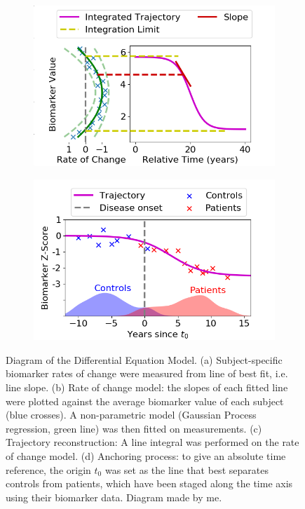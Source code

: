 \begin{figure}
  \begin{subfigure}{0.47\textwidth}
    \includegraphics[width=\textwidth]{images/demDiagramPlots/fig3_recon.png}
    \caption{}
    \label{fig:pcaDemDiagramC}
 \end{subfigure}
 \begin{subfigure}{0.47\textwidth}
     \includegraphics[width=\textwidth]{images/demDiagramPlots/fig4_align.png}
    \caption{}
    \label{fig:pcaDemDiagramD}
 \end{subfigure}
 \caption[Diagram of the Differential Equation Model]{Diagram of the Differential Equation Model. (a) Subject-specific biomarker rates of change were measured from line of best fit, i.e. line slope. (b) Rate of change model: the slopes of each fitted line were plotted against the average biomarker value of each subject (blue crosses). A non-parametric model (Gaussian Process regression, green line) was then fitted on measurements. (c) Trajectory reconstruction: A line integral was performed on the rate of change model. (d) Anchoring process: to give an absolute time reference, the origin $t_0$ was set as the line that best separates controls from patients, which have been staged along the time axis using their biomarker data. Diagram made by me.}
 \label{fig:pcaDemDiagram}
\end{figure}


